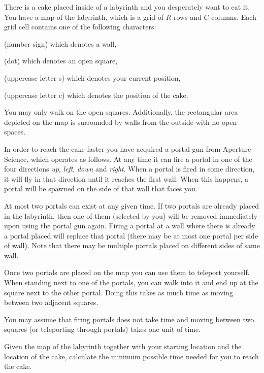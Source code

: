 \documentclass{../../../latex/boi2014}
\newcommand{\constant}[1]{{\tt #1}}
\begin{document}
    There is a cake placed inside of a labyrinth and you desperately want
    to eat it. You have a map of the labyrinth, which is
    a grid of $R$ rows and $C$ columns.
    Each grid cell contains one of the following characters:
    \begin{description}[itemindent=1pt]
    	\item[\constant{\#}] (number sign) which denotes a wall,
        \item[\constant{.}] (dot) which denotes an open square,
        \item[\constant{S}] (uppercase letter s) which denotes your current position,
        \item[\constant{C}] (uppercase letter c) which denotes the position of the cake.
    \end{description}
    You may only walk on the open squares. Additionally, the rectangular
    area depicted on the map is surrounded by walls from the outside
    with no open spaces.

    In order to reach the cake faster you have acquired a portal gun from
    Aperture Science\texttrademark{}, which operates as follows.
    At any time it can fire a portal in one of the four directions
    \emph{up}, \emph{left}, \emph{down} and \emph{right}.
    When a portal is fired in some direction, it will fly in that direction
    until it reaches the first wall. When this happens, a portal
    will be spawned on the side of that wall that faces you.

    At most two portals can exist at any given time. If two portals
    are already placed in the labyrinth, then one of them (selected
    by you) will be removed immediately upon using the portal gun
    again. Firing a portal at a wall where there is already a portal
    placed will replace that portal (there may be at most one portal
    per side of wall).
    Note that there may be multiple portals placed
    on different sides of same wall.

    Once two portals are placed on the map you can use them to
    teleport yourself. When standing next to one of the portals,
    you can walk into it and end up at the square next to the other
    portal. Doing this takes as much time as moving between two
    adjacent squares.

    You may assume that firing portals does not take time and moving
    between two squares (or teleporting through portals) takes one unit
    of time.

    \Task
    Given the map of the labyrinth together with your starting location
    and the location of the cake, calculate the minimum possible time needed
    for you to reach the cake.
\end{document}
